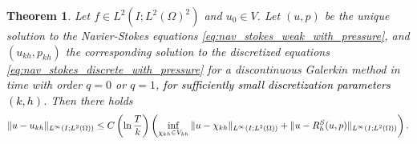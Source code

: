 \documentclass{m2an}
\newcommand\blue[1]{\textcolor{black}{#1}}
\newtheorem{theorem}{Theorem}[section]
\newcommand{\Oprod}[1]{\left( #1 \right)_{\Omega}}
\newcommand{\Vkh}{V_{kh}}
\newcommand{\ukh}{u_{kh}}
\newcommand{\pkh}{p_{kh}}
\newcommand{\LinfLtwo}{L^\infty(I;L^2(\Omega))}
\newcommand{\lnh}{|\!\ln h|}
\begin{document}
\begin{theorem}\label{thm:nav_stokes_bestapprox}
  Let $f \in L^2(I;L^2(\Omega)^2)$ and $u_0 \in V$.
  Let $(u,p)$ be the unique solution to the Navier-Stokes equations \eqref{eq:nav_stokes_weak_with_pressure},
  and $(\ukh,\pkh)$ the corresponding solution to the discretized equations 
  \eqref{eq:nav_stokes_discrete_with_pressure} for a discontinuous Galerkin method in time with
  order $q=0$ or $q=1$, \blue{for sufficiently small discretization parameters $(k,h)$.}
  Then there holds
  \begin{equation*}
    \|u - \ukh\|_{\LinfLtwo} \le C \left(\ln \frac{T}{k}\right)
    \left(
      \inf_{\blue{\chi_{kh}} \in \Vkh} \|u - \blue{\chi_{kh}}\|_{\LinfLtwo} 
    + \|u - R_h^S(u,p)\|_{\LinfLtwo}\right).
  \end{equation*}
\end{theorem}
\end{document}
